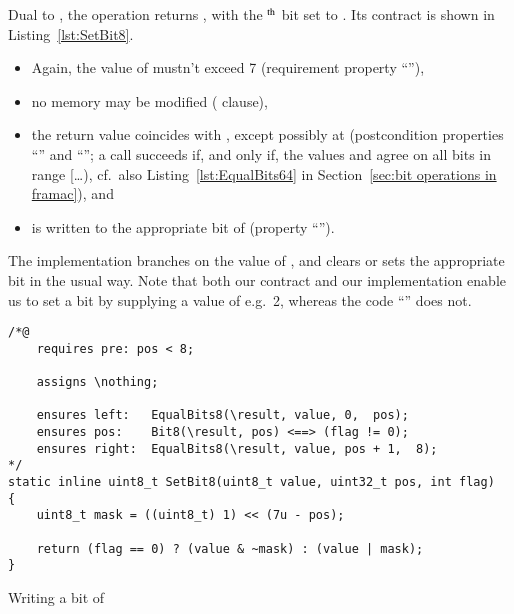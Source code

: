 Dual to , the operation
returns , 
with the $^{\mbox{\scriptsize th}}$ bit
set to .
%
Its contract is shown in Listing~\ref{lst:SetBit8}.
%
\begin{itemize}
\item Again, the value of  mustn't exceed 7 
	(requirement property ``''),
\item no memory may be modified ( clause),
\item the return value coincides with , except possibly
	at  (postcondition properties ``'' 
	and ``''; a call
	 succeeds if, and
	only if, the  values  and
	 agree on all bits in range
	[\ldots{}), cf.\ also
	Listing~\ref{lst:EqualBits64} in 
	Section~\ref{sec:bit operations in framac}), and 
\item {} is written to the appropriate bit of 
	 (property ``'').
\end{itemize}
%
The implementation branches on the value of , and
clears or sets the
appropriate bit in the usual way.
%
Note that both our contract and our implementation enable us to set
a bit by supplying a
 value of e.g.\ 2, whereas the code 
``'' does not.





\begin{listing}[hbt]
\begin{minipage}{0.99\textwidth}
\begin{lstlisting}[style=acsl-block]
/*@
    requires pre: pos < 8;

    assigns \nothing;

    ensures left:   EqualBits8(\result, value, 0,  pos);
    ensures pos:    Bit8(\result, pos) <==> (flag != 0);
    ensures right:  EqualBits8(\result, value, pos + 1,  8);
*/
static inline uint8_t SetBit8(uint8_t value, uint32_t pos, int flag)
{
    uint8_t mask = ((uint8_t) 1) << (7u - pos);

    return (flag == 0) ? (value & ~mask) : (value | mask);
}
\end{lstlisting}
\end{minipage}
\caption{\label{lst:SetBit8}Writing a bit of }
\end{listing}





















